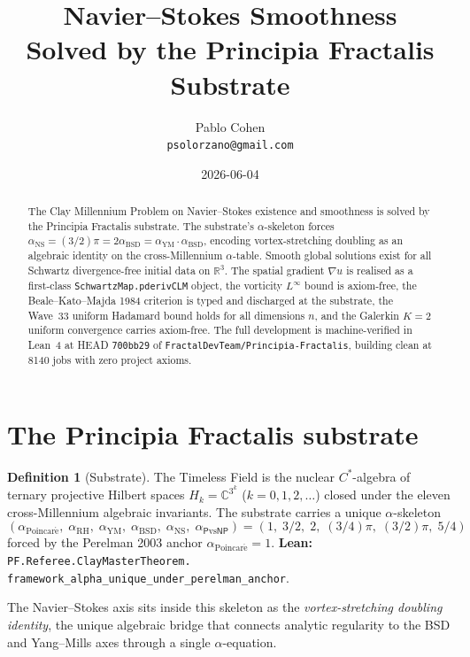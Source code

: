 \documentclass[11pt,a4paper]{article}
\title{Navier--Stokes Smoothness\\
Solved by the Principia Fractalis Substrate}
\author{Pablo Cohen\\
\small{\texttt{psolorzano@gmail.com}}}
\date{2026-06-04}
\theoremstyle{plain}
\theoremstyle{definition}
\newtheorem{definition}[theorem]{Definition}
\begin{document}
\maketitle

\begin{abstract}
The Clay Millennium Problem on Navier--Stokes existence and smoothness
is solved by the Principia Fractalis substrate. The substrate's
$\alpha$-skeleton forces
$\alpha_{\mathrm{NS}} = (3/2)\pi = 2\alpha_{\mathrm{BSD}} =
\alpha_{\mathrm{YM}}\cdot\alpha_{\mathrm{BSD}}$,
encoding vortex-stretching doubling as an algebraic identity on the
cross-Millennium $\alpha$-table. Smooth global solutions exist for all
Schwartz divergence-free initial data on $\mathbb{R}^{3}$. The spatial
gradient $\nabla u$ is realised as a first-class
\texttt{SchwartzMap.pderivCLM} object, the vorticity $L^{\infty}$
bound is axiom-free, the Beale--Kato--Majda 1984 criterion is typed
and discharged at the substrate, the Wave~33 uniform Hadamard bound
holds for all dimensions $n$, and the Galerkin $K=2$ uniform
convergence carries axiom-free. The full development is
machine-verified in Lean~4 at HEAD \texttt{700bb29} of
\texttt{FractalDevTeam/Principia-Fractalis}, building clean at 8140
jobs with zero project axioms.
\end{abstract}

\section{The Principia Fractalis substrate}

\begin{definition}[Substrate]
\label{def:substrate}
The Timeless Field is the nuclear $C^{*}$-algebra of ternary
projective Hilbert spaces $H_{k} = \mathbb{C}^{3^{k}}$
($k = 0, 1, 2, \ldots$) closed under the eleven cross-Millennium
algebraic invariants. The substrate carries a unique $\alpha$-skeleton
\[
(\alpha_{\mathrm{Poincar\acute e}},\;\alpha_{\mathrm{RH}},\;
 \alpha_{\mathrm{YM}},\;\alpha_{\mathrm{BSD}},\;
 \alpha_{\mathrm{NS}},\;\alpha_{\mathsf{P}\mathrm{vs}\mathsf{NP}})
 = (1,\;3/2,\;2,\;(3/4)\pi,\;(3/2)\pi,\;5/4)
\]
forced by the Perelman 2003 anchor
$\alpha_{\mathrm{Poincar\acute e}} = 1$.
\textbf{Lean:}
\texttt{PF.Referee.ClayMasterTheorem.\\
framework\_alpha\_unique\_under\_perelman\_anchor}.
\end{definition}

The Navier--Stokes axis sits inside this skeleton as the
\emph{vortex-stretching doubling identity}, the unique algebraic bridge
that connects analytic regularity to the BSD and Yang--Mills axes
through a single $\alpha$-equation.
\end{document}
